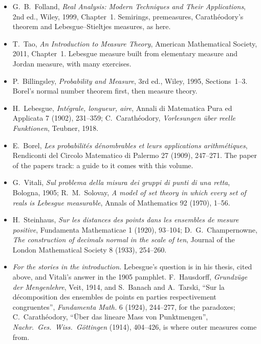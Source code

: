 \begin{itemize}
\item G.~B.~Folland, \emph{Real Analysis: Modern Techniques and Their Applications}, 2nd ed., Wiley, 1999, Chapter~1. Semirings, premeasures,
Carath\'eodory's theorem and Lebesgue--Stieltjes measures, as here.
\item T.~Tao, \emph{An Introduction to Measure Theory}, American Mathematical Society, 2011, Chapter~1. Lebesgue measure built from elementary
measure and Jordan measure, with many exercises.
\item P.~Billingsley, \emph{Probability and Measure}, 3rd ed., Wiley, 1995, Sections~1--3. Borel's normal number theorem first, then measure theory.
\item H.~Lebesgue, \emph{Int\'egrale, longueur, aire}, Annali di Matematica Pura ed Applicata 7 (1902), 231--359; C.~Carath\'eodory, \emph{Vorlesungen \"uber
reelle Funktionen}, Teubner, 1918.
\item E.~Borel, \emph{Les probabilit\'es d\'enombrables et leurs applications arithm\'etiques}, Rendiconti del Circolo Matematico di Palermo 27 (1909),
247--271. The paper of the papers track: a guide to it comes with this volume.
\item G.~Vitali, \emph{Sul problema della misura dei gruppi di punti di una retta}, Bologna, 1905; R.~M.~Solovay, \emph{A model of set theory in which every
set of reals is Lebesgue measurable}, Annals of Mathematics 92 (1970), 1--56.
\item H.~Steinhaus, \emph{Sur les distances des points dans les ensembles de mesure positive}, Fundamenta Mathematicae 1 (1920), 93--104; D.~G.~Champernowne,
\emph{The construction of decimals normal in the scale of ten}, Journal of the London Mathematical Society 8 (1933), 254--260.
\item \emph{For the stories in the introduction.} Lebesgue's question is in his thesis, cited above, and Vitali's answer in the 1905 pamphlet. F.~Hausdorff, \emph{Grundz\"uge der
Mengenlehre}, Veit, 1914, and S.~Banach and A.~Tarski, ``Sur la d\'ecomposition des ensembles de points en parties respectivement congruentes'', \emph{Fundamenta Math.}
6 (1924), 244--277, for the paradoxes; C.~Carath\'eodory, ``\"Uber das lineare Mass von Punktmengen'', \emph{Nachr.\ Ges.\ Wiss.\ G\"ottingen} (1914), 404--426, is where outer measures come from.
\end{itemize}
